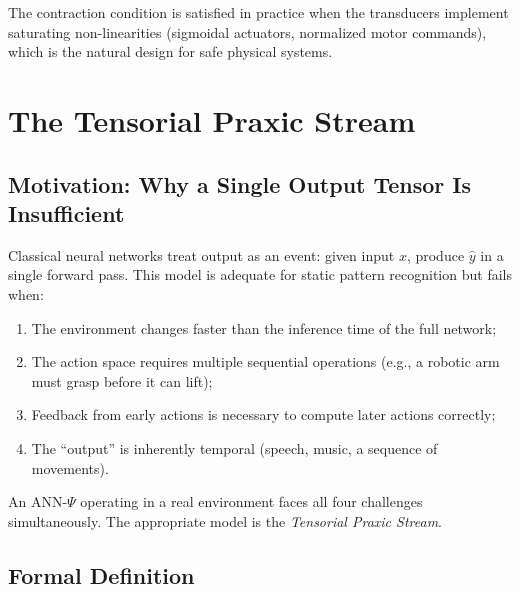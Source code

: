\documentclass[12pt,a4paper]{article}
\begin{document}
The contraction condition is satisfied in practice when the transducers implement
saturating non-linearities (sigmoidal actuators, normalized motor commands), which
is the natural design for safe physical systems.

\section{The Tensorial Praxic Stream}
\label{sec:tps}

\subsection{Motivation: Why a Single Output Tensor Is Insufficient}

Classical neural networks treat output as an event: given input $x$, produce
$\hat{y}$ in a single forward pass. This model is adequate for static pattern
recognition but fails when:
\begin{enumerate}
\item The environment changes faster than the inference time of the full network;
\item The action space requires multiple sequential operations (e.g., a robotic
arm must grasp before it can lift);
\item Feedback from early actions is necessary to compute later actions correctly;
\item The ``output'' is inherently temporal (speech, music, a sequence of movements).
\end{enumerate}
An ANN-$\Psi$ operating in a real environment faces all four challenges
simultaneously. The appropriate model is the \textit{Tensorial Praxic Stream}.

\subsection{Formal Definition}
\end{document}
